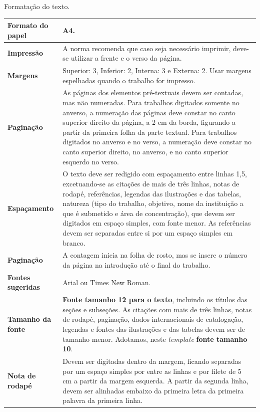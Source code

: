 \begin{quadro}[htb]
	\centering
	\caption{\label{qua:Quadro_1}Formatação do texto.}	
	\begin{tabular}{|l|p{11cm}|}
		\hline
		\textbf{Formato do papel} & A4.\\ \hline
		\textbf{Impressão}        & A norma recomenda que caso seja necessário imprimir, deve-se utilizar a frente e o verso da página.\\ \hline
		\textbf{Margens}          & Superior: 3, Inferior: 2, Interna: 3 e Externa: 2. Usar margens espelhadas quando o  trabalho for impresso.\\ \hline
		\textbf{Paginação}        & As páginas dos elementos pré-textuais devem ser contadas, mas não numeradas. Para trabalhos digitados somente no anverso, a numeração das páginas deve constar no canto superior direito da página, a 2 cm da borda, figurando a partir da primeira folha da  parte textual. Para trabalhos digitados no anverso e no verso, a numeração deve constar no canto superior direito, no anverso, e no canto superior esquerdo no verso.\\ \hline
		\textbf{Espaçamento}      & O texto deve ser redigido com espaçamento entre linhas 1,5, excetuando-se as citações de mais de três linhas, notas de rodapé, referências, legendas das ilustrações e das tabelas, natureza (tipo do trabalho, objetivo, nome da instituição a que é submetido e área de concentração), que devem ser digitados em espaço simples, com fonte menor. As referências devem ser separadas entre si por um espaço simples em branco.\\ \hline
		\textbf{Paginação}        & A contagem inicia na folha de rosto, mas se insere o número da página na introdução até o final do trabalho.\\ \hline
		\textbf{Fontes sugeridas} & Arial ou Times New Roman.\\ \hline
		\textbf{Tamanho da fonte} & \textbf{Fonte tamanho 12 para o texto}, incluindo os títulos das seções e subseções. As citações com mais de três linhas, notas de rodapé, paginação, dados internacionais de catalogação, legendas e fontes das ilustrações e das tabelas devem ser de tamanho menor. Adotamos, neste \textit{template} \textbf{fonte tamanho 10}.\\ \hline
		\textbf{Nota de rodapé}   & Devem ser digitadas dentro da margem, ficando separadas por um espaço simples por entre as linhas e por filete de 5 cm a partir da margem esquerda. A partir da segunda linha, devem ser alinhadas embaixo da primeira letra da primeira palavra da primeira linha.\\ \hline
	\end{tabular}
\end{quadro}

